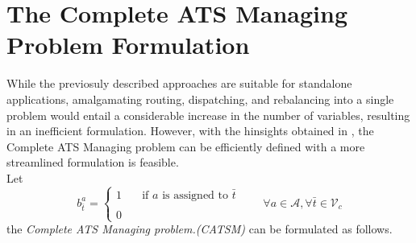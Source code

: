 \section{The Complete ATS Managing Problem Formulation}\label{sec:catsm}
While the previosuly described approaches are suitable for standalone applications, amalgamating routing, dispatching, and rebalancing into a single problem would entail a considerable increase in the number of variables, resulting in an inefficient formulation. However, with the hinsights obtained in , the  Complete ATS Managing problem can be efficiently defined with a more streamlined formulation is feasible. \\
Let 
\begin{equation*}
	b_{\bar{t}}^a = 
	\begin{cases} 
		1 & \quad \text{if $a$ is assigned to }\bar{t} \\
		\\
		0
	\end{cases}
	\quad\quad \forall a \in \mathcal{A}, \forall \bar{t} \in \mathcal{V}_c
	\label{eq:assignment}
\end{equation*}
the \textit{Complete ATS Managing problem.(CATSM)} can be formulated as follows. \\

